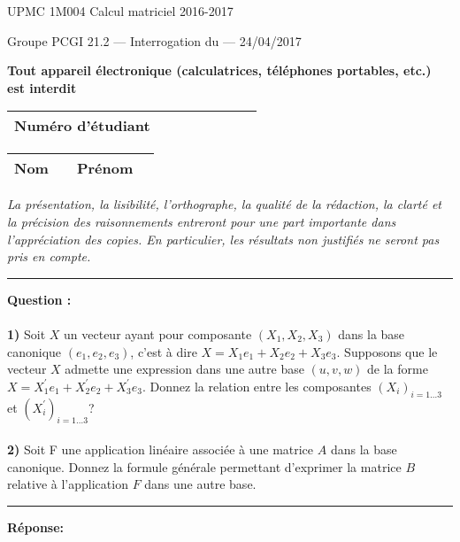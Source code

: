 \documentclass[11pt]{article}
\begin{document}
{\large UPMC \hfill 1M004 Calcul matriciel \hfill 2016-2017}

\vskip -3mm
\noindent \textbf{\hrulefill}

\vskip 1mm

\centerline{
{\large Groupe PCGI 21.2 \hspace{1.7 cm} --- Interrogation du --- \hspace{3.5 cm}  24/04/2017}}


\vskip -2mm
\noindent \textbf{\hrulefill}



\vskip 2mm

\centerline{\textbf{Tout appareil \'electronique (calculatrices, t\'el\'ephones portables, etc.) est interdit}}

\vskip 2mm
{\LARGE
\begin{center}
\begin{tabular}{|p{7cm}|p{1cm}|p{1cm}|p{1cm}|p{1cm}|p{1cm}|p{1cm}|p{1cm}|}
\hline
\textbf{Num\'ero d'\'etudiant} &     & & & & &   &
\\
\hline
\end{tabular}

\vskip 0.25cm

\begin{tabular}{|p{2cm}|p{6cm}|p{3cm}|p{5cm}|}
\hline
\textbf{Nom} &     & \textbf{Pr\'enom   }  &   \\
\hline
\end{tabular}
\end{center}
} %


{\sl  La pr\'esentation, la lisibilit\'e, l'orthographe, la
 qualit\'e de la r\'edaction, la clart\'e et la pr\'ecision des
 raisonnements entreront pour une part importante dans
 l'appr\'eciation des copies. En particulier, les r\'esultats non
 justifi\'es ne seront pas pris en compte. }


\vskip 3mm
\hrule

\vskip 3mm
\noindent \textbf{Question :}\\\\
\textbf{1)}
Soit $X$ un vecteur ayant pour composante $(X_1,X_2,X_3)$ dans la base canonique $(e_1,e_2,e_3)$, c'est à dire $X = X_1 e_1 + X_2 e_2 + X_3 e_3$. Supposons que le vecteur $X$ admette une expression dans une autre base $(u,v,w)$ de la forme $X = X_1^{'} e_1 +X_2^{'} e_2 + X_3^{'} e_3$. Donnez la relation entre les composantes $(X_i)_{i=1 \ldots 3}$ et $(X_i^{'})_{i=1 \ldots 3}$?\\\\
\textbf{2)} Soit F une application linéaire associée à une matrice $A$ dans la base canonique. Donnez la formule générale permettant d'exprimer la matrice $B$ relative à l'application $F$  dans une autre base. 




\kern\medskipamount

\hrule

\vskip 3mm


\noindent \textbf{Réponse:}\\

\newpage
\end{document}
